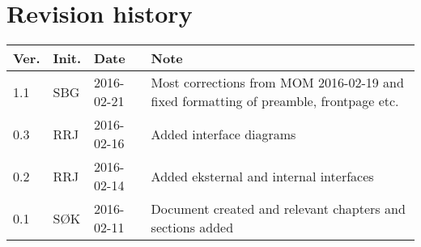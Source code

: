 \label{chp_revisionHistory}
\chapter{Revision history}

\begin{tabular}{b{1cm} b{1cm} b{2cm} b{8cm}}
	\textbf{Ver.} & \textbf{Init.} & \textbf{Date} & \textbf{Note}\\
	\hline
    1.1 & SBG & 2016-02-21 & Most corrections from MOM 2016-02-19 and fixed formatting of preamble, frontpage etc.\\
    0.3 & RRJ & 2016-02-16 & Added interface diagrams \\
    0.2 & RRJ & 2016-02-14 & Added eksternal and internal interfaces \\
    0.1 & SØK & 2016-02-11 & Document created and relevant chapters and sections added \\
\end{tabular}

